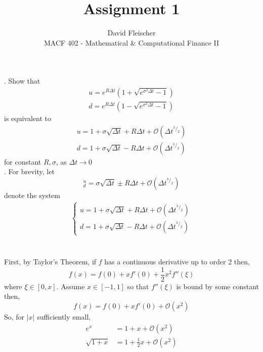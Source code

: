\documentclass[12pt]{article}
\begin{document}
 
 
\title{Assignment 1}
\author{David Fleischer\\ 
MACF 402 - Mathematical \& Computational Finance II}
 
\maketitle
{}. Show that \\
\begin{align}
u = e^{R\Delta t}(1 + \sqrt{e^{\sigma^2\Delta t} - 1}) \label{q1u} \\
d = e^{R\Delta t}(1 - \sqrt{e^{\sigma^2\Delta t} - 1}) \label{q1d}
\end{align}
is equivalent to
\begin{align*}
u = 1 + \sigma\sqrt{\Delta t} + R\Delta t + \mathcal O(\Delta t^{^3/_2}) \\
d = 1 + \sigma\sqrt{\Delta t} - R\Delta t + \mathcal O(\Delta t^{^3/_2})
\end{align*}
for constant $R, \sigma$, as $\Delta t \longrightarrow 0$ \\

. For brevity, let
\begin{equation*}
^u_d =  \sigma\sqrt{\Delta t} \pm R\Delta t + \mathcal O(\Delta t^{^3/_2})
\end{equation*}
\noindent denote the system
\begin{align*}
    \left\{
                \begin{array}{ll}
u = 1 + \sigma\sqrt{\Delta t} + R\Delta t + \mathcal O(\Delta t^{^3/_2}) \\
d = 1 + \sigma\sqrt{\Delta t} - R\Delta t + \mathcal O(\Delta t^{^3/_2})
                \end{array}
              \right.
\end{align*}
\\
\\
\noindent First, by Taylor's Theorem, if $f$ has a continuous derivative up to order 2 then,
\begin{equation*}
	f(x) = f(0) + xf'(0) + \frac{1}{2}x^2f''(\xi) 	
\end{equation*}
where $\xi \in [0,x]$. Assume $x \in [-1,1]$ so that $f''(\xi)$ is bound by some constant then,
\begin{equation*}
	f(x) = f(0) + xf'(0) + \mathcal O(x^2)
\end{equation*}
So, for $|x|$ sufficiently small,
\begin{align}
	e^x & = 1 + x + \mathcal O(x^2) \label{exp} \\
	\sqrt{1 + x} & = 1 + \frac{1}{2}x + \mathcal O(x^2) \label{sqrt}
\end{align}
\end{document}
